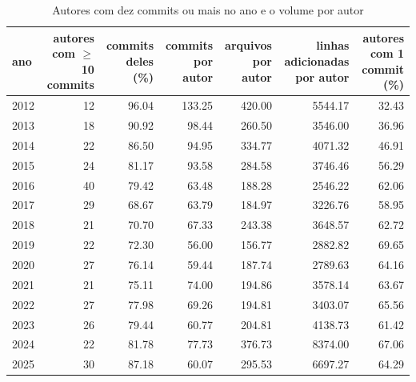 \begin{table}[htbp]
\centering
\caption{Autores com dez commits ou mais no ano e o volume por autor}
\label{tab:volume_autores_frequentes}
\begin{tabular}{lrrrrrr}
\toprule
ano & autores com $\geq$10 commits & commits deles (\%) & commits por autor & arquivos por autor & linhas adicionadas por autor & autores com 1 commit (\%) \\
\midrule
2012 & 12 & 96.04 & 133.25 & 420.00 & 5544.17 & 32.43 \\
2013 & 18 & 90.92 & 98.44 & 260.50 & 3546.00 & 36.96 \\
2014 & 22 & 86.50 & 94.95 & 334.77 & 4071.32 & 46.91 \\
2015 & 24 & 81.17 & 93.58 & 284.58 & 3746.46 & 56.29 \\
2016 & 40 & 79.42 & 63.48 & 188.28 & 2546.22 & 62.06 \\
2017 & 29 & 68.67 & 63.79 & 184.97 & 3226.76 & 58.95 \\
2018 & 21 & 70.70 & 67.33 & 243.38 & 3648.57 & 62.72 \\
2019 & 22 & 72.30 & 56.00 & 156.77 & 2882.82 & 69.65 \\
2020 & 27 & 76.14 & 59.44 & 187.74 & 2789.63 & 64.16 \\
2021 & 21 & 75.11 & 74.00 & 194.86 & 3578.14 & 63.67 \\
2022 & 27 & 77.98 & 69.26 & 194.81 & 3403.07 & 65.56 \\
2023 & 26 & 79.44 & 60.77 & 204.81 & 4138.73 & 61.42 \\
2024 & 22 & 81.78 & 77.73 & 376.73 & 8374.00 & 67.06 \\
2025 & 30 & 87.18 & 60.07 & 295.53 & 6697.27 & 64.29 \\
\bottomrule
\end{tabular}
\end{table}
